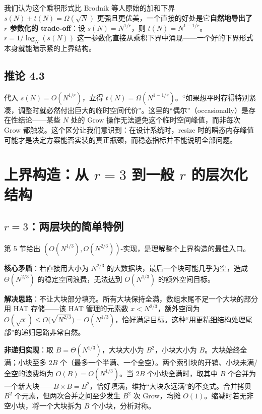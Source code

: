 \documentclass[12pt,a4paper]{ctexart}
\begin{document}
我们认为这个乘积形式比 Brodnik 等人原始的加和下界 $s(N) + t(N) = \Omega(\sqrt{N})$ 更强且更优美，一个直接的好处是它\textbf{自然地导出了 $r$ 参数化的 trade-off}：设 $s(N) = N^{1/r}$，则 $t(N) = N^{1-1/r}$。$r = 1/\log_N(s(N))$ 这一参数化直接从乘积下界中涌现——一个好的下界形式本身就能暗示紧的上界结构。

\subsection{推论 4.3}

代入 $s(N) = O(N^{1/r})$，立得 $t(N) = \Omega(N^{1-1/r})$。``如果想平时存得特别紧凑，调整时就必然付出巨大的临时空间代价''。这里的``偶尔''（occasionally）是存在性结论——某些 $N$ 处的 Grow 操作无法避免这个临时空间峰值，而非每次 Grow 都触发。这个区分让我们意识到：在设计系统时，resize 时的瞬态内存峰值可能才是决定方案能否实装的真正瓶颈，而稳态指标并不能说明全部问题。

\section{上界构造：从 $r = 3$ 到一般 $r$ 的层次化结构}

\subsection{$r = 3$：两层块的简单特例}

第 5 节给出 $(O(N^{1/3}), O(N^{2/3}))$-实现，是理解整个上界构造的最佳入口。

\textbf{核心矛盾}：若直接用大小为 $N^{2/3}$ 的大数据块，最后一个块可能几乎为空，造成 $\Theta(N^{2/3})$ 的稳定空间浪费，无法达到 $O(N^{1/3})$ 的额外空间目标。

\textbf{解决思路}：不让大块部分填充。所有大块保持全满，数组末尾不足一个大块的部分用 HAT 存储——该 HAT 管理的元素数 $x < N^{2/3}$，额外空间为 $O(\sqrt{x}) \le O\bigl(\sqrt{N^{2/3}}\bigr) = O(N^{1/3})$，恰好满足目标。这种``用更精细结构处理尾部''的递归思路非常自然。

\textbf{非递归实现}：取 $B = \Theta(N^{1/3})$，大块大小为 $B^2$，小块大小为 $B$。大块始终全满；小块至多 $2B$ 个（最多一个半满、一个全空）。两个索引块的开销、小块未满/全空的浪费均为 $O(B) = O(N^{1/3})$。当 $2B$ 个小块全满时，取其中 $B$ 个合并为一个新大块——$B \times B = B^2$，恰好填满，维持``大块永远满''的不变式。合并拷贝 $B^2$ 个元素，但两次合并之间至少发生 $B^2$ 次 Grow，均摊 $O(1)$。缩减时若无非空小块，将一个大块拆为 $B$ 个小块，分析对称。
\end{document}
